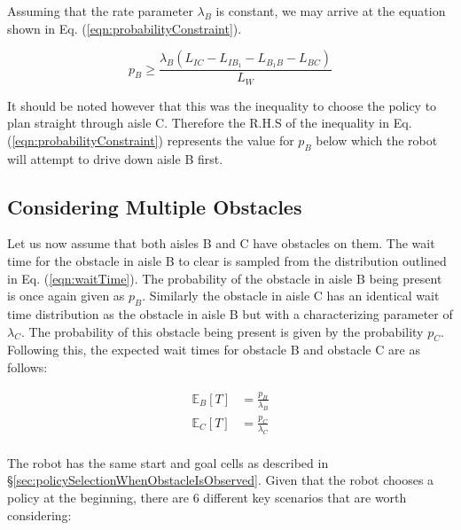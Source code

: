 \documentclass[a4paper,12pt]{article}
\begin{document}
			Assuming that the rate parameter $\lambda_B$ is constant, we may arrive at the equation shown in Eq. (\ref{eqn:probabilityConstraint}).
			
			\begin{equation}
				p_B \geq \frac{\lambda_B\left(L_{IC}-L_{IB_1}-L_{B_1B}-L_{BC}\right)}{L_W}
			\label{eqn:probabilityConstraint}
			\end{equation}
		
			It should be noted however that this was the inequality to choose the policy to plan straight through aisle C. Therefore the R.H.S of the inequality in Eq. (\ref{eqn:probabilityConstraint}) represents the value for $p_B$ below which the robot will attempt to drive down aisle B first. 
		
		\subsection{Considering Multiple Obstacles}
		\label{sec:consideringMultipleObstacles}
			Let us now assume that both aisles B and C have obstacles on them. The wait time for the obstacle in aisle B to clear is sampled from the distribution outlined in Eq. (\ref{eqn:waitTime}). The probability of the obstacle in aisle B being present is once again given as $p_B$. Similarly the obstacle in aisle C has an identical wait time distribution as the obstacle in aisle B but with a characterizing parameter of $\lambda_C$. The probability of this obstacle being present is given by the probability $p_C$. Following this, the expected wait times for obstacle B and obstacle C are as follows:
			
			\begin{equation}
			\begin{split}
				\mathbb{E}_{B}[T] &= \frac{p_B}{\lambda_B} \\
				\mathbb{E}_{C}[T] &= \frac{p_C}{\lambda_C} \\
			\end{split}
			\label{eqn:expectedWaitTimeBC}
			\end{equation}
			
			The robot has the same start and goal cells as described in \S \ref{sec:policySelectionWhenObstacleIsObserved}. Given that the robot chooses a policy at the beginning, there are 6 different key scenarios that are worth considering:
			
\end{document}
